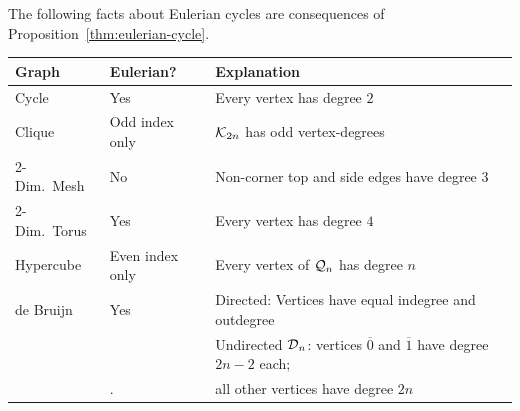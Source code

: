 \begin{corol}
\label{corol:eulerian-named-graphs}
The following facts about Eulerian cycles are consequences of Proposition~\ref{thm:eulerian-cycle}.

\medskip

{\small
\begin{tabular}{|l|l|l|}
\hline
Graph & Eulerian? & Explanation \\
\hline \hline
Cycle                          & Yes                          & Every vertex has degree $2$ \\
\hline
Clique                         & Odd index only       & $\mbox{$\cal K$}_{2n}$ has odd vertex-degrees \\
\hline
2-Dim.~Mesh  & No                           & Non-corner top and side edges have degree $3$ \\  
\hline                     
2-Dim.~Torus  & Yes                          & Every vertex has degree $4$ \\
\hline
Hypercube                  & Even index only & Every vertex of $\mbox{$\cal Q$}_n$ has degree $n$ \\
\hline
de Bruijn                     & Yes  & Directed: Vertices have equal {\sc indegree} and {\sc outdegree} \\
                                   &         & Undirected $\mbox{$\cal D$}_n$: vertices $\overline{0}$ and $\overline{1}$ have
                                                  degree $2n-2$ each; \\
                                    &.       & \hspace*{.77in}all other vertices have degree $2n$ \\
\hline
\end{tabular}
}
\end{corol}


